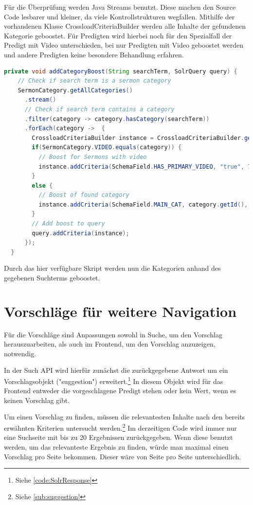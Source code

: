 Für die Überprüfung werden Java Streams benutzt.
Diese machen den Source Code lesbarer und kleiner, da viele Kontrollstrukturen wegfallen.
Mithilfe der vorhandenen Klasse CrossloadCriteriaBuilder werden alle Inhalte der gefundenen Kategorie geboostet.
Für Predigten wird hierbei noch für den Spezialfall der Predigt mit Video unterschieden, bei nur Predigten mit Video geboostet werden und andere Predigten keine besondere Behandlung erfahren.

\begin{lstlisting}[language=Java, title={Code für Überprüfung und Boosten der Kategorien. \cite{solr-search2022}}]
  private void addCategoryBoost(String searchTerm, SolrQuery query) {
    // Check if search term is a sermon category
    SermonCategory.getAllCategories()
      .stream()
      // Check if search term contains a category
      .filter(category -> category.hasCategory(searchTerm))
      .forEach(category ->  {
        CrossloadCriteriaBuilder instance = CrossloadCriteriaBuilder.getInstance();
        if(SermonCategory.VIDEO.equals(category)) {
          // Boost for Sermons with video
          instance.addCriteria(SchemaField.HAS_PRIMARY_VIDEO, "true", 75);
        }
        else {
          // Boost of found category
          instance.addCriteria(SchemaField.MAIN_CAT, category.getId(), 75);
        }
        // Add boost to query
        query.addCriteria(instance);
      });
  }
\end{lstlisting}

Durch das hier verfügbare Skript werden nun die Kategorien anhand des gegebenen Suchterms geboostet.

\section{Vorschläge für weitere Navigation}
\label{sec:devSuggestions}

Für die Vorschläge sind Anpassungen sowohl in Suche, um den Vorschlag herauszuarbeiten, als auch im Frontend, um den Vorschlag anzuzeigen, notwendig.

In der Such API wird hierfür zunächst die zurückgegebene Antwort um ein Vorschlagsobjekt ("suggestion") erweitert.\footnote{Siehe \ref{code:SolrResponse}}
In diesem Objekt wird für das Frontend entweder die vorgeschlagene Predigt stehen oder kein Wert, wenn es keinen Vorschlag gibt.

Um einen Vorschlag zu finden, müssen die relevantesten Inhalte nach den bereits erwähnten Kriterien untersucht werden.\footnote{Siehe \ref{sub:suggestion}}
Im derzeitigen Code wird immer nur eine Suchseite mit bis zu 20 Ergebnissen zurückgegeben.
Wenn diese benutzt werden, um das relevanteste Ergebnis zu finden, würde man maximal einen Vorschlag pro Seite bekommen.
Dieser wäre von Seite pro Seite unterschiedlich.

